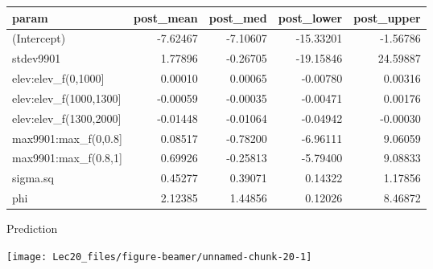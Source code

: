 \documentclass[11pt,ignorenonframetext,]{beamer}
\newenvironment{Shaded}{}{}
\newcommand{\DataTypeTok}[1]{\textcolor[rgb]{0.56,0.13,0.00}{#1}}
\newcommand{\DecValTok}[1]{\textcolor[rgb]{0.25,0.63,0.44}{#1}}
\newcommand{\KeywordTok}[1]{\textcolor[rgb]{0.00,0.44,0.13}{\textbf{#1}}}
\newcommand{\NormalTok}[1]{#1}
\newcommand{\OperatorTok}[1]{\textcolor[rgb]{0.40,0.40,0.40}{#1}}
\newcommand{\StringTok}[1]{\textcolor[rgb]{0.25,0.44,0.63}{#1}}
\let\oldShaded\Shaded
\let\endoldShaded\endShaded
\renewenvironment{Shaded}{\footnotesize\begin{spacing}{0.9}\oldShaded}{\endoldShaded\end{spacing}}
\begin{document}
\begin{frame}[fragile]{}
\protect\hypertarget{section}{}

\footnotesize

\begin{Shaded}
\end{Shaded}

\begin{longtable}[]{@{}lrrrr@{}}
\toprule
param & post\_mean & post\_med & post\_lower &
post\_upper\tabularnewline
\midrule
\endhead
(Intercept) & -7.62467 & -7.10607 & -15.33201 & -1.56786\tabularnewline
stdev9901 & 1.77896 & -0.26705 & -19.15846 & 24.59887\tabularnewline
elev:elev\_f(0,1000{]} & 0.00010 & 0.00065 & -0.00780 &
0.00316\tabularnewline
elev:elev\_f(1000,1300{]} & -0.00059 & -0.00035 & -0.00471 &
0.00176\tabularnewline
elev:elev\_f(1300,2000{]} & -0.01448 & -0.01064 & -0.04942 &
-0.00030\tabularnewline
max9901:max\_f(0,0.8{]} & 0.08517 & -0.78200 & -6.96111 &
9.06059\tabularnewline
max9901:max\_f(0.8,1{]} & 0.69926 & -0.25813 & -5.79400 &
9.08833\tabularnewline
sigma.sq & 0.45277 & 0.39071 & 0.14322 & 1.17856\tabularnewline
phi & 2.12385 & 1.44856 & 0.12026 & 8.46872\tabularnewline
\bottomrule
\end{longtable}

\end{frame}

\begin{frame}{Prediction}
\protect\hypertarget{prediction}{}

\begin{center}\texttt{[image: Lec20\_files/figure-beamer/unnamed-chunk-20-1]} \end{center}

\end{frame}
\end{document}
